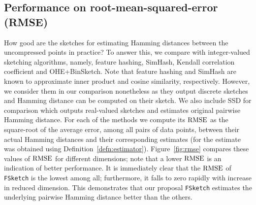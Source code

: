 \subsection{Performance on root-mean-squared-error (RMSE)}\label{subsubsec:rmse}
How good are the sketches for estimating Hamming distances between the uncompressed points in practice? To answer this, we compare \fsketch with integer-valued sketching algorithms, namely,  {feature hashing}, {SimHash}, {Kendall correlation coefficient} and OHE+BinSketch.   Note that {feature hashing} and {SimHash} are known to approximate inner product and cosine similarity, respectively. However, we consider them in our comparison nonetheless as they output discrete sketches and Hamming distance can be computed on their sketch. We also include SSD for comparison which outputs real-valued sketches and  estimates original pairwise Hamming distance. 
For each of the methods we compute its $\mathrm{RMSE}$ as the square-root of the average error, among all pairs of data points, between their actual Hamming distances and their corresponding estimates (for \fsketch the estimate was obtained using Definition~\ref{defn:estimator}). Figure~\ref{fig:rmse} compares these values of $\mathrm{RMSE}$ for different dimensions; note that a lower $\mathrm{RMSE}$ is an indication of better performance. It is immediately clear that the $\mathrm{RMSE}$ of \texttt{FSketch} is the lowest among all; furthermore, it falls to zero rapidly with increase in reduced  dimension.  This demonstrates that our proposal \texttt{FSketch} estimates the underlying  pairwise Hamming distance better than the others.


